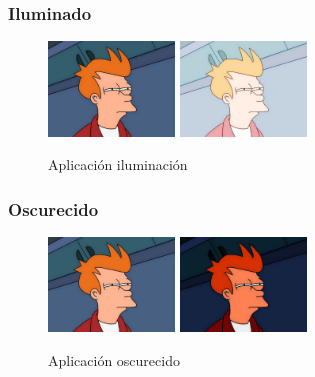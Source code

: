\subsubsection{Iluminado}
\vskip0.3cm
\begin{figure}[H]
 \centering
  \includegraphics[width=0.3\textwidth]{imagenes/Fry.jpg}
  \includegraphics[width=0.3\textwidth]{imagenes/fryIluminado.jpg}
 \caption{Aplicación iluminación}
 \label{diseño}
\end{figure}
\subsubsection{Oscurecido}
\vskip0.3cm
\begin{figure}[H]
 \centering
  \includegraphics[width=0.3\textwidth]{imagenes/Fry.jpg}
  \includegraphics[width=0.3\textwidth]{imagenes/fryOscurecido.jpg}
 \caption{Aplicación oscurecido}
 \label{diseño}
\end{figure}
